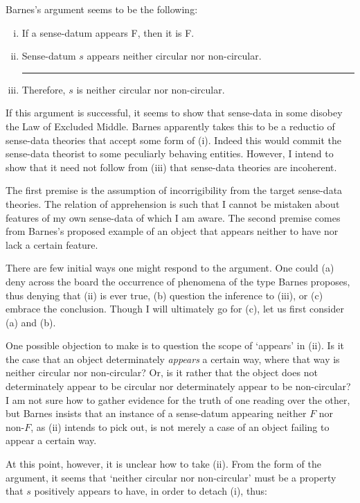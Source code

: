 \noindent Barnes's argument seems to be the following:

\begin{enumerate}[i.]
\item If a sense-datum appears F, then it is F.
\item Sense-datum $s$ appears neither circular nor non-circular.
\smallskip
\hrule width 325pt
\item Therefore, $s$ is neither circular nor non-circular.
\end{enumerate}

\noindent If this argument is successful, it seems to show that sense-data in some disobey the Law of Excluded Middle. Barnes apparently takes this to be a reductio of sense-data theories that accept some form of (i). Indeed this would commit the sense-data theorist to some peculiarly behaving entities. However, I intend to show that it need not follow from (iii) that sense-data theories are incoherent.

The first premise is the assumption of incorrigibility from the target sense-data theories. The relation of apprehension is such that I cannot be mistaken about features of my own sense-data of which I am aware. The second premise comes from Barnes's proposed example of an object that appears neither to have nor lack a certain feature.

There are few initial ways one might respond to the argument. One could (a) deny across the board the occurrence of phenomena of the type Barnes proposes, thus denying that (ii) is ever true, (b) question the inference to (iii), or (c) embrace the conclusion. Though I will ultimately go for (c), let us first consider (a) and (b).

One possible objection to make is to question the scope of `appears' in (ii). Is it the case that an object determinately \emph{appears} a certain way, where that way is neither circular nor non-circular? Or, is it rather that the object does not determinately appear to be circular nor determinately appear to be non-circular? I am not sure how to gather evidence for the truth of one reading over the other, but Barnes insists that an instance of a sense-datum appearing neither $F$ nor non-$F$, as (ii) intends to pick out, is not merely a case of an object failing to appear a certain way.

At this point, however, it is unclear how to take (ii). From the form of the argument, it seems that `neither circular nor non-circular' must be a property that $s$ positively appears to have, in order to detach (i), thus:

